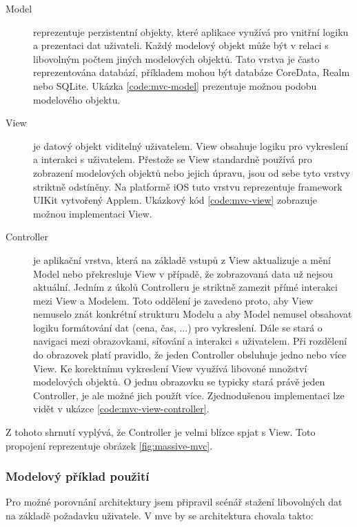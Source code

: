 \begin{description}
  \item[Model] reprezentuje perzistentní objekty, které aplikace využívá pro vnitřní logiku a prezentaci dat uživateli.
  Každý modelový objekt může být v relaci s libovolným počtem jiných modelových objektů.
  Tato vrstva je často reprezentována databází, příkladem mohou být databáze CoreData, Realm nebo SQLite.
  Ukázka \ref{code:mvc-model} prezentuje možnou podobu modelového objektu.

  \item[View] je datový objekt viditelný uživatelem. View obsahuje logiku pro vykreslení a interakci s uživatelem.
  Přestože se View standardně používá pro zobrazení modelových objektů nebo jejich úpravu, jsou od sebe tyto vrstvy striktně odstíněny.
  Na platformě iOS tuto vrstvu reprezentuje framework UIKit vytvořený Applem.
  Ukázkový kód \ref{code:mvc-view} zobrazuje možnou implementaci View.

  \item[Controller] je aplikační vrstva, která na základě vstupů z View aktualizuje a mění Model nebo překresluje View v případě, že zobrazovaná data už nejsou aktuální.
  Jedním z úkolů Controlleru je striktně zamezit přímé interakci mezi View a Modelem.
  Toto oddělení je zavedeno proto, aby View nemuselo znát konkrétní strukturu Modelu a aby Model nemusel obsahovat logiku formátování dat (cena, čas, ...) pro vykreslení.
  Dále se stará o navigaci mezi obrazovkami, síťování a interakci s uživatelem.
  Při rozdělení do obrazovek platí pravidlo, že jeden Controller obsluhuje jedno nebo více View.
  Ke korektnímu vykreslení View využívá libovoné množství modelových objektů.
  O jednu obrazovku se typicky stará právě jeden Controller, je ale možné jich použít více.
  Zjednodušenou implementaci lze vidět v ukázce \ref{code:mvc-view-controller}.
\end{description}

Z tohoto shrnutí vyplývá, že Controller je velmi blízce spjat s View. Toto propojení reprezentuje obrázek \ref{fig:massive-mvc}.

\subsubsection*{Modelový příklad použití}

Pro možné porovnání architektury jsem připravil scénář stažení libovolných dat na základě požadavku uživatele.
V \acrshort{mvc} by se architektura chovala takto:

